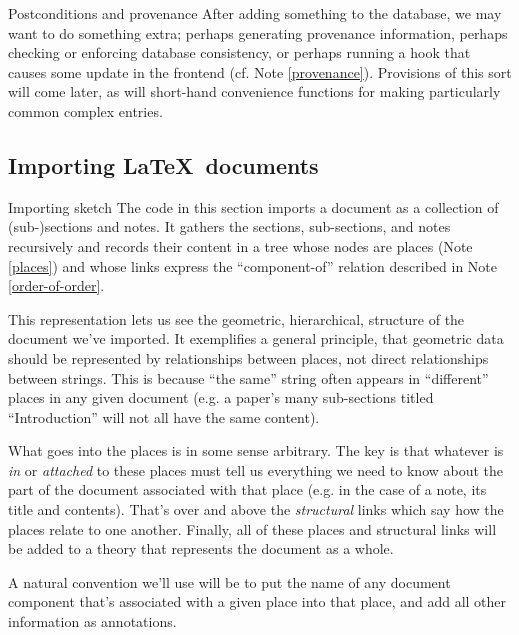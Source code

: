\begin{notate}{Postconditions and provenance}
After adding something to the database, we may want to do
something extra; perhaps generating provenance
information, perhaps checking or enforcing database
consistency, or perhaps running a hook that causes some
update in the frontend (cf. Note \ref{provenance}).
Provisions of this sort will come later, as will
short-hand convenience functions for making particularly
common complex entries.
\end{notate}

\subsection{Importing \LaTeX\ documents} \label{importing}

\begin{notate}{Importing sketch} \label{importing-sketch}
The code in this section imports a document as a
collection of (sub-)sections and notes.  It gathers the
sections, sub-sections, and notes recursively and records
their content in a tree whose nodes are places (Note
\ref{places}) and whose links express the ``component-of''
relation described in Note \ref{order-of-order}.

This representation lets us see the geometric,
hierarchical, structure of the document we've imported.
It exemplifies a general principle, that geometric data
should be represented by relationships between places, not
direct relationships between strings.  This is because
``the same'' string often appears in ``different'' places
in any given document (e.g. a paper's many sub-sections
titled ``Introduction'' will not all have the same
content).

What goes into the places is in some sense arbitrary.  The
key is that whatever is \emph{in} or \emph{attached} to
these places must tell us everything we need to know about
the part of the document associated with that place
(e.g. in the case of a note, its title and contents).
That's over and above the \emph{structural} links which
say how the places relate to one another.  Finally, all of
these places and structural links will be added to a
theory that represents the document as a whole.

A natural convention we'll use will be to put the name
of any document component that's associated with a given
place into that place, and add all other information as
annotations.
\end{notate}


